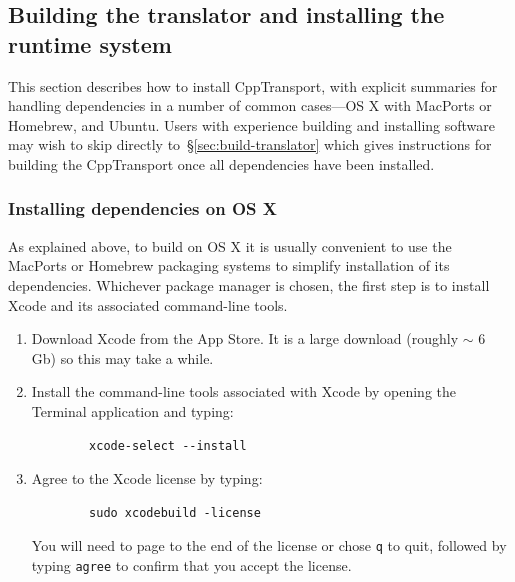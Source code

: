 \documentclass[11pt,a4paper]{article}
\newcommand{\packagefont}{\sffamily}
\newcommand{\CppTransport}{{\packagefont CppTransport}}
\newcommand{\Xcode}{{\packagefont Xcode}}
\newcommand{\MacPorts}{{\packagefont MacPorts}}
\newcommand{\Homebrew}{{\packagefont Homebrew}}
\begin{document}
\subsection{Building the translator and installing the runtime system}

This section describes how to install {\CppTransport},
with explicit summaries for handling dependencies in a number of
common cases---OS X with {\MacPorts} or {\Homebrew}, and Ubuntu.
Users with experience building and installing software may wish
to skip directly to~\S\ref{sec:build-translator}
which gives instructions for building the {\CppTransport}
once all dependencies have been installed.

\subsubsection{Installing dependencies on OS X}

As explained above, to build on OS X it is usually convenient to use
the {\MacPorts} or {\Homebrew} packaging systems to simplify installation
of its dependencies.
Whichever package manager is chosen, the first step is to install
{\Xcode} and its associated command-line tools.
\begin{enumerate}
    \item Download {\Xcode} from the App Store. It is a large download
    (roughly $\sim$ 6 Gb) so this may take a while.
    
    \item Install the command-line tools associated with {\Xcode}
    by opening the Terminal application and typing:
    \begin{verbatim}
        xcode-select --install    
    \end{verbatim}
    
    \item Agree to the {\Xcode} license by typing:
    \begin{verbatim}
        sudo xcodebuild -license    
    \end{verbatim}
    You will need to page to the end of the license or chose
    \texttt{q} to quit, followed by typing
    \texttt{agree} to confirm that you accept the license.
\end{enumerate}
\end{document}
